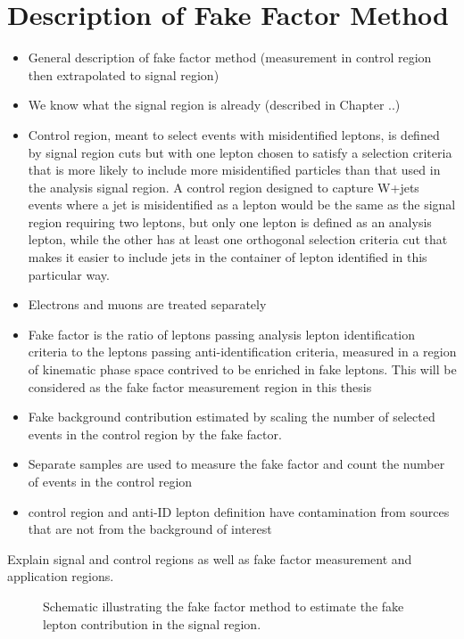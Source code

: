 \section{Description of Fake Factor Method}
\begin{itemize}
\item General description of fake factor method (measurement in control region then extrapolated to signal region)
\item We know what the signal region is already (described in Chapter ..)
\item Control region, meant to select events with misidentified leptons, is defined by signal region cuts but with one lepton chosen to satisfy a selection criteria that is more likely to include more misidentified particles than that used in the analysis signal region.  A control region designed to capture W+jets events where a jet is misidentified as a lepton would be the same as the signal region requiring two leptons, but only one lepton is defined as an analysis lepton, while the other has at least one orthogonal selection criteria cut that makes it easier to include jets in the container of lepton identified in this particular way.
\item Electrons and muons are treated separately
\item Fake factor is the ratio of leptons passing analysis lepton identification criteria to the leptons passing anti-identification criteria, measured in a region of kinematic phase space contrived to be enriched in fake leptons.  This will be considered as the fake factor measurement region in this thesis
\item Fake background contribution estimated by scaling the number of selected events in the control region by the fake factor.
\item Separate samples are used to measure the fake factor and count the number of events in the control region
\item control region and anti-ID lepton definition have contamination from sources that are not from the background of interest
\end{itemize}

Explain signal and control regions as well as fake factor measurement and application regions. 
\begin{figure}
\centering
 
 \caption{Schematic illustrating the fake factor method to estimate the fake lepton contribution in the signal region.}
 \label{fig:fake_schematic}
 \end{figure}
 
